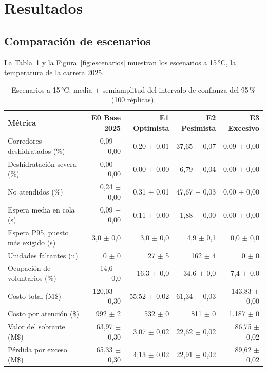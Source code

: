\documentclass[11pt,a4paper]{article}
\begin{document}
\section{Resultados}

\subsection{Comparación de escenarios}

La Tabla~\ref{tab:escenarios} y la Figura~\ref{fig:escenarios} muestran los escenarios a 15\,°C, la temperatura de la carrera 2025.

\begin{table}[H]
\centering
\small
\begin{tabular}{lrrrr}
\toprule
\textbf{Métrica} & \textbf{E0 Base 2025} & \textbf{E1 Optimista} & \textbf{E2 Pesimista} & \textbf{E3 Excesivo} \\
\midrule
Corredores deshidratados (\%) & 0,09 $\pm$ 0,00 & 0,20 $\pm$ 0,01 & 37,65 $\pm$ 0,07 & 0,09 $\pm$ 0,00 \\
Deshidratación severa (\%) & 0,00 $\pm$ 0,00 & 0,00 $\pm$ 0,00 & 6,79 $\pm$ 0,04 & 0,00 $\pm$ 0,00 \\
No atendidos (\%) & 0,24 $\pm$ 0,00 & 0,31 $\pm$ 0,01 & 47,67 $\pm$ 0,03 & 0,00 $\pm$ 0,00 \\
Espera media en cola (s) & 0,09 $\pm$ 0,00 & 0,11 $\pm$ 0,00 & 1,88 $\pm$ 0,00 & 0,00 $\pm$ 0,00 \\
Espera P95, puesto más exigido (s) & 3,0 $\pm$ 0,0 & 3,0 $\pm$ 0,0 & 4,9 $\pm$ 0,1 & 0,0 $\pm$ 0,0 \\
Unidades faltantes (u) & 0 $\pm$ 0 & 27 $\pm$ 5 & 162 $\pm$ 4 & 0 $\pm$ 0 \\
Ocupación de voluntarios (\%) & 14,6 $\pm$ 0,0 & 16,3 $\pm$ 0,0 & 34,6 $\pm$ 0,0 & 7,4 $\pm$ 0,0 \\
Costo total (M\$) & 120,03 $\pm$ 0,30 & 55,52 $\pm$ 0,02 & 61,34 $\pm$ 0,03 & 143,83 $\pm$ 0,00 \\
Costo por atención (\$) & 992 $\pm$ 2 & 532 $\pm$ 0 & 811 $\pm$ 0 & 1.187 $\pm$ 0 \\
Valor del sobrante (M\$) & 63,97 $\pm$ 0,30 & 3,07 $\pm$ 0,02 & 22,62 $\pm$ 0,02 & 86,75 $\pm$ 0,02 \\
Pérdida por exceso (M\$) & 65,33 $\pm$ 0,30 & 4,13 $\pm$ 0,02 & 22,91 $\pm$ 0,02 & 89,62 $\pm$ 0,02 \\
\bottomrule
\end{tabular}
\caption{Escenarios a 15\,°C: media $\pm$ semiamplitud del intervalo de confianza del 95\,\% (100 réplicas).}
\label{tab:escenarios}
\end{table}
\end{document}
